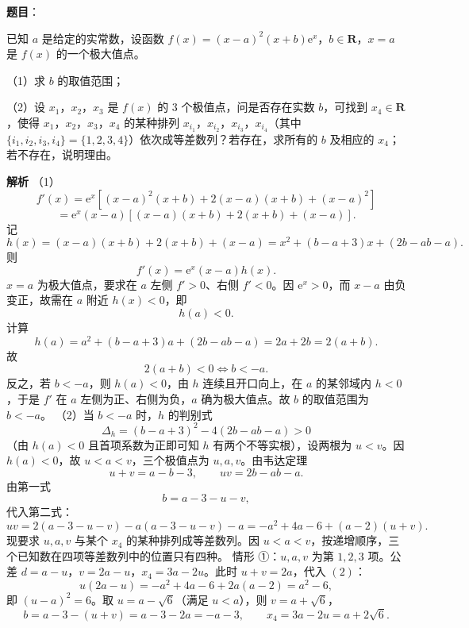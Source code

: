 \begin{answer}

\textbf{题目}：

已知 $a$ 是给定的实常数，设函数 $f(x)=(x-a)^2(x+b)\mathrm e^x$，$b\in\mathbf R$，$x=a$ 是 $f(x)$ 的一个极大值点。

（1）求 $b$ 的取值范围；

（2）设 $x_1$，$x_2$，$x_3$ 是 $f(x)$ 的 $3$ 个极值点，问是否存在实数 $b$，可找到 $x_4\in\mathbf R$，使得 $x_1$，$x_2$，$x_3$，$x_4$ 的某种排列 $x_{i_1}$，$x_{i_2}$，$x_{i_3}$，$x_{i_4}$（其中 $\{i_1,i_2,i_3,i_4\}=\{1,2,3,4\}$）依次成等差数列？若存在，求所有的 $b$ 及相应的 $x_4$；若不存在，说明理由。

\textbf{解析}
（1）
\nopagebreak[4]
\[f'(x)=\mathrm e^x\left[(x-a)^2(x+b)+2(x-a)(x+b)+(x-a)^2\right]\]
\nopagebreak[4]
\[=\mathrm e^x(x-a)\left[(x-a)(x+b)+2(x+b)+(x-a)\right].\]
记
\nopagebreak[4]
\[h(x)=(x-a)(x+b)+2(x+b)+(x-a)
=x^2+(b-a+3)x+(2b-ab-a).\]
则
\nopagebreak[4]
\[f'(x)=\mathrm e^x(x-a)h(x).\]
$x=a$ 为极大值点，要求在 $a$ 左侧 $f'>0$、右侧 $f'<0$。因 $\mathrm e^x>0$，而 $x-a$ 由负变正，故需在 $a$ 附近 $h(x)<0$，即
\nopagebreak[4]
\[h(a)<0.\]
计算
\nopagebreak[4]
\[h(a)=a^2+(b-a+3)a+(2b-ab-a)=2a+2b=2(a+b).\]
故
\nopagebreak[4]
\[2(a+b)<0\iff b<-a.\]
反之，若 $b<-a$，则 $h(a)<0$，由 $h$ 连续且开口向上，在 $a$ 的某邻域内 $h<0$，于是 $f'$ 在 $a$ 左侧为正、右侧为负，$a$ 确为极大值点。故 $b$ 的取值范围为 $b<-a$。
（2）当 $b<-a$ 时，$h$ 的判别式
\nopagebreak[4]
\[\Delta_h=(b-a+3)^2-4(2b-ab-a)>0\]
（由 $h(a)<0$ 且首项系数为正即可知 $h$ 有两个不等实根），设两根为 $u<v$。因 $h(a)<0$，故 $u<a<v$，三个极值点为 $u,a,v$。由韦达定理
\nopagebreak[4]
\[u+v=a-b-3,\qquad uv=2b-ab-a.\tag{1}\]
由第一式
\nopagebreak[4]
\[b=a-3-u-v,\]
代入第二式：
\nopagebreak[4]
\[uv=2(a-3-u-v)-a(a-3-u-v)-a
=-a^2+4a-6+(a-2)(u+v).\tag{2}\]
现要求 $u,a,v$ 与某个 $x_4$ 的某种排列成等差数列。因 $u<a<v$，按递增顺序，三个已知数在四项等差数列中的位置只有四种。
情形 ①：$u,a,v$ 为第 $1,2,3$ 项。公差 $d=a-u$，$v=2a-u$，$x_4=3a-2u$。此时 $u+v=2a$，代入 $(2)$：
\nopagebreak[4]
\[u(2a-u)=-a^2+4a-6+2a(a-2)=a^2-6,\]
即 $(u-a)^2=6$。取 $u=a-\sqrt6$（满足 $u<a$），则 $v=a+\sqrt6$，
\nopagebreak[4]
\[b=a-3-(u+v)=a-3-2a=-a-3,\qquad x_4=3a-2u=a+2\sqrt6.\]

\end{answer}
